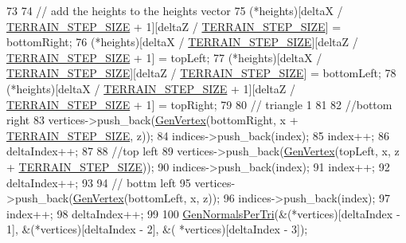 \begin{DoxyCode}
73 
74             \textcolor{comment}{// add the heights to the heights vector}
75             (*heights)[deltaX / \mbox{\hyperlink{_terrain_generation_helper_8h_ad04a251ab3e1323474688977de1579e4}{TERRAIN\_STEP\_SIZE}} + 1][deltaZ / 
      \mbox{\hyperlink{_terrain_generation_helper_8h_ad04a251ab3e1323474688977de1579e4}{TERRAIN\_STEP\_SIZE}}] = bottomRight;
76             (*heights)[deltaX / \mbox{\hyperlink{_terrain_generation_helper_8h_ad04a251ab3e1323474688977de1579e4}{TERRAIN\_STEP\_SIZE}}][deltaZ / 
      \mbox{\hyperlink{_terrain_generation_helper_8h_ad04a251ab3e1323474688977de1579e4}{TERRAIN\_STEP\_SIZE}} + 1] = topLeft;
77             (*heights)[deltaX / \mbox{\hyperlink{_terrain_generation_helper_8h_ad04a251ab3e1323474688977de1579e4}{TERRAIN\_STEP\_SIZE}}][deltaZ / 
      \mbox{\hyperlink{_terrain_generation_helper_8h_ad04a251ab3e1323474688977de1579e4}{TERRAIN\_STEP\_SIZE}}] = bottomLeft;
78             (*heights)[deltaX / \mbox{\hyperlink{_terrain_generation_helper_8h_ad04a251ab3e1323474688977de1579e4}{TERRAIN\_STEP\_SIZE}} + 1][deltaZ / 
      \mbox{\hyperlink{_terrain_generation_helper_8h_ad04a251ab3e1323474688977de1579e4}{TERRAIN\_STEP\_SIZE}} + 1] = topRight;
79 
80             \textcolor{comment}{// triangle 1}
81 
82             \textcolor{comment}{//bottom right}
83             vertices->push\_back(\mbox{\hyperlink{class_terrain_generation_helper_a3ef70fded2f8984224915ec14c1238a7}{GenVertex}}(bottomRight, x + 
      \mbox{\hyperlink{_terrain_generation_helper_8h_ad04a251ab3e1323474688977de1579e4}{TERRAIN\_STEP\_SIZE}}, z));
84             indices->push\_back(index);
85             index++;
86             deltaIndex++;
87 
88             \textcolor{comment}{//top left}
89             vertices->push\_back(\mbox{\hyperlink{class_terrain_generation_helper_a3ef70fded2f8984224915ec14c1238a7}{GenVertex}}(topLeft, x, z + 
      \mbox{\hyperlink{_terrain_generation_helper_8h_ad04a251ab3e1323474688977de1579e4}{TERRAIN\_STEP\_SIZE}}));
90             indices->push\_back(index);
91             index++;
92             deltaIndex++;
93 
94             \textcolor{comment}{// bottm left}
95             vertices->push\_back(\mbox{\hyperlink{class_terrain_generation_helper_a3ef70fded2f8984224915ec14c1238a7}{GenVertex}}(bottomLeft, x, z));
96             indices->push\_back(index);
97             index++;
98             deltaIndex++;
99             
100             \mbox{\hyperlink{class_terrain_generation_helper_a1989d3e408497b90675799ded98feaf1}{GenNormalsPerTri}}(&(*vertices)[deltaIndex - 1], &(*vertices)[deltaIndex - 2], &(
      *vertices)[deltaIndex - 3]);

\end{DoxyCode}
